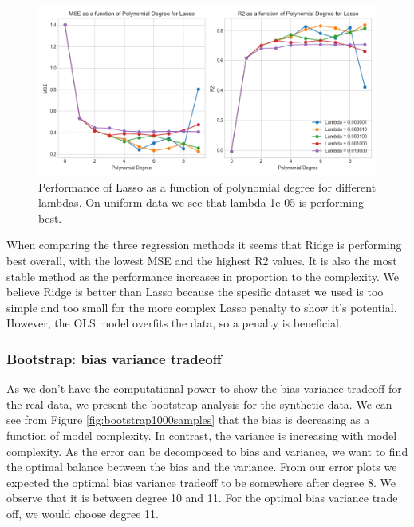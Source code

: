 \begin{figure}[H]
     \includegraphics[width=15cm]{Images/lasso_error_degree.png}
     \caption{Performance of Lasso as a function of polynomial degree for different lambdas. On uniform data we see that lambda 1e-05 is performing best.}
     \label{fig:lasso mse}
\end{figure}

When comparing the three regression methods it seems that Ridge is performing best overall, with the lowest MSE and the highest R2 values. It is also the most stable method as the performance increases in proportion to the complexity. We believe Ridge is better than Lasso because the spesific dataset we used is too simple and too small for the more complex Lasso penalty to show it's potential. However, the OLS model overfits the data, so a penalty is beneficial. 

\subsubsection{Bootstrap: bias variance tradeoff}

As we don't have the computational power to show the bias-variance tradeoff for the real data, we present the bootstrap analysis for the synthetic data. We can see from Figure \ref{fig:bootstrap1000samples} that the bias is decreasing as a function of model complexity. In contrast, the variance is increasing with model complexity. As the error can be decomposed to bias and variance, we want to find the optimal balance between the bias and the variance. From our error plots we expected the optimal bias variance tradeoff to be somewhere after degree 8. We observe that it is between degree 10 and 11. For the optimal bias variance trade off, we would choose degree 11. 

